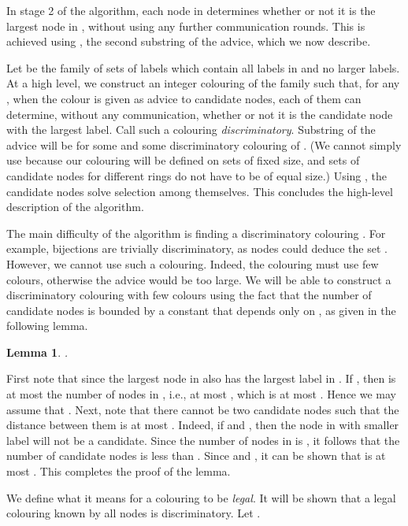 \documentclass[11pt]{article}
\newtheorem{lemma}{Lemma}[section]
\newcommand{\qed}{\hfill  \bigbreak}
\newenvironment{proof}{\noindent {\bf Proof.}}{\qed}
\begin{document}
In stage 2 of the algorithm, each node in  determines whether or not it is the largest node in , without using any further communication rounds. This is achieved using , the second substring of the advice, which we now describe.

Let  be the family of sets  of labels which contain all labels in  and no larger labels.
At a high level, we construct an integer colouring  of the family  such that, for any ,  
when the colour  is given as advice to candidate nodes, each of them can determine, without any communication, whether or not it is the candidate node with the largest label.
Call such a colouring {\em discriminatory}. 
Substring  of the advice will be  for some  and some discriminatory colouring  of . (We cannot simply use  because our colouring  will be defined on sets of fixed size, and sets of candidate nodes for different rings do not have to be of equal size.) 
Using , the candidate nodes solve selection among themselves.
This concludes the high-level description of the algorithm.

The main difficulty of the algorithm is finding  a discriminatory colouring . 
For example, bijections are trivially discriminatory, as nodes could deduce the set .
However, we cannot use such a colouring. Indeed, the colouring must use few colours, otherwise the advice would be too large.
We will be able to construct a discriminatory colouring with few colours  using the fact that the number of candidate nodes is bounded by a constant that depends only on , as given in the following lemma. 



\begin{lemma}\label{boundcandidates}
.
\end{lemma}
\begin{proof}
First note that  since the largest node  in  also has the largest label in . 
If , then  is at most the number of nodes in , i.e., at most , which is at most . Hence we may assume that .
Next, note that there cannot be two candidate nodes  such that the distance between them is at most . Indeed, if  and , then the node in  with smaller label will not be a candidate. Since the number of nodes in  is , it follows that the number of candidate nodes is less than . 
Since  and , it can be shown that  is at most . This completes the proof of the lemma.
\end{proof}



We define what it means for a colouring to be \emph{legal}. 
It will be shown that a legal colouring known by all nodes is discriminatory. Let . 
\end{document}
